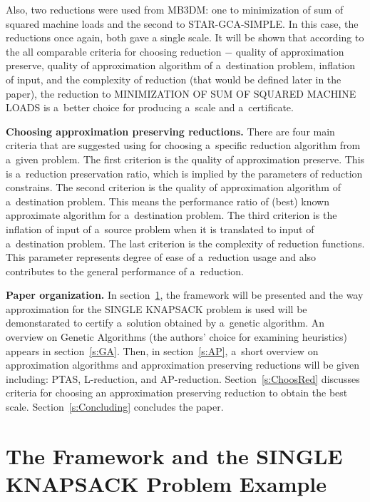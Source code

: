 \begin{multicols}{2}
Also, two reductions were used from {MB3DM}: one to {
minimization of sum of squared machine loads} and the second to
{STAR-GCA-SIMPLE}. In this case, the reductions once again, both gave
a single scale. It will be shown that according to the all comparable
criteria for choosing reduction $-$ quality of approximation
preserve, quality of approximation algorithm of a~destination
problem, inflation of input, and the complexity of reduction (that
would be defined later in the paper), the reduction to {
MINIMIZATION OF SUM OF SQUARED MACHINE LOADS} is a~better choice for
producing a~scale and a~certificate.

\noindent
\textbf{Choosing approximation preserving reductions.} There
are four main criteria that are suggested using for choosing a~specific
reduction algorithm from a~given problem. The first criterion is the
quality of approximation preserve. This is a~reduction preservation
ratio, which is implied by the parameters of reduction constrains.
The second criterion is the quality of approximation algorithm of
a~destination problem. This means the performance ratio of (best)
known approximate algorithm for a~destination problem. The third
criterion is the inflation of input of a~source problem when it is
translated to input of a~destination problem. The last criterion is
the complexity of reduction functions. This parameter represents
degree of ease of a~reduction usage and also contributes to the
general performance of a~reduction.

\noindent
\textbf{Paper organization.} In section~\ref{s:demo},
the framework will be presented and the way approximation for the
{SINGLE KNAPSACK} problem is used will be demonstarated
to certify a~solution obtained
by a~genetic algorithm. An overview on Genetic Algorithms (the authors'
choice for examining heuristics) appears in section~\ref{s:GA}.
Then, in section~\ref{s:AP}, a~short overview on
approximation algorithms and approximation preserving reductions will
be given including: PTAS, L-reduction, and AP-reduction. Section~\ref{s:ChoosRed} discusses criteria for choosing an approximation
preserving reduction to obtain the best scale. Section~\ref{s:Concluding} concludes the paper.

\vspace*{-6pt}

\section{The Framework and the SINGLE KNAPSACK Problem Example}
\label{s:demo}


\end{multicols}
